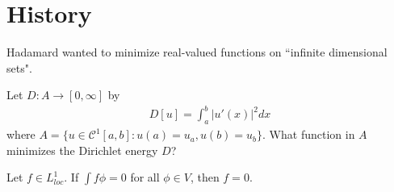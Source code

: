 \documentclass[12pt,class=article,crop=false]{standalone}
\begin{document}
\section{History}
Hadamard wanted to minimize real-valued functions on ``infinite dimensional sets".
\begin{eg}
	Let $ D: A \to [0, \infty]$ by
	\begin{align*}
		D[u] = \int_{ a}^{ b} |u'(x)|^2 dx 
	\end{align*}
	where $ A = \{u \in \mathcal{ C}^{1}[a,b] : u(a)=u_a, u(b)=u_b\} $. What function in $ A$ minimizes the Dirichlet energy  $ D$?
\end{eg}

\begin{lem}
Let $ f \in L_{loc}^{1}$. If $ \int f \phi = 0$ for all $ \phi \in V$, then $ f=0$.
\end{lem}
\end{document}
